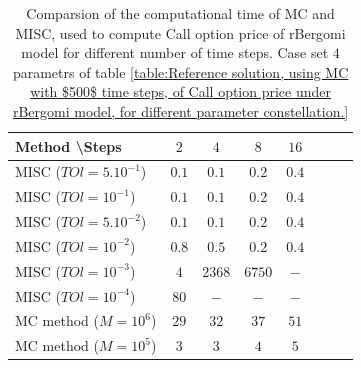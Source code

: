 \documentclass[11pt]{article}
\begin{document}
\begin{table}[h!]
	\centering
	\begin{tabular}{l*{6}{c}r}
		Method \textbackslash  Steps            & $2$ & $4$ & $8$ & $16$ &   \\
		\hline
		MISC ($TOl=5.10^{-1}$)  & $0.1$ & $0.1$ & $0.2$ & $0.4$  \\
		MISC ($TOl=10^{-1}$)  & $0.1$ & $0.1$ & $0.2$ & $0.4$\\
		MISC ($TOl=5.10^{-2}$)  & $0.1$ & $0.1$ & $0.2$ & $0.4$ \\
		MISC ($TOl=10^{-2}$)  & $0.8$ & $0.5$ & $0.2$ & $0.4$  \\
		MISC ($TOl=10^{-3}$)  & $4$ & $2368$ & $6750$ & $-$  \\
		MISC ($TOl=10^{-4}$)  & $80$ & $-$ & $-$ & $-$  \\
		\hline
		MC method ($M=10^6$)   & $29$  & $32$  & $37$ & $51$  \\	
		MC method ($M=10^5$)   & $3$  & $3$  & $4$ & $5$  \\
		\hline
	\end{tabular}
	\caption{Comparsion of the computational time of  MC and MISC, used to compute Call option price of rBergomi model for different number of time steps. Case set $4$ parametrs of table \ref{table:Reference solution, using MC with $500$ time steps, of Call option price under rBergomi model, for different parameter constellation.} }
	\label{Comparsion of the computational time of  MC and MISC, used to compute Call option price of rBergomi model for different number of time steps. Case set4}
\end{table}
\end{document}
